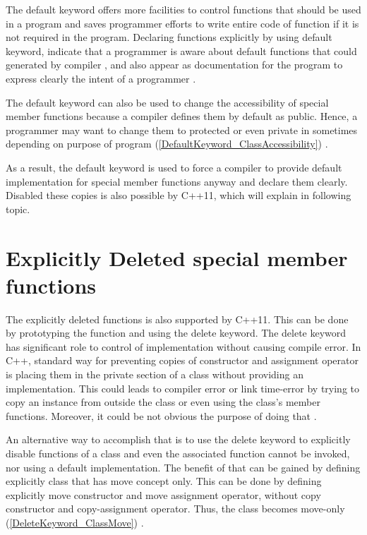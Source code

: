 \documentclass[11pt]{report}
\begin{document}
The default keyword offers more facilities to control functions that should be used in a program and saves programmer efforts to write entire code of function if it is not required in the program.  Declaring functions  explicitly by using default keyword, indicate  that  a programmer is  aware about  default functions that could generated by compiler , and also appear as documentation for the program to express clearly  the intent of a programmer \cite{Horstmann:2008:BC}.


The default keyword can also be used to change the accessibility of special member functions because a compiler defines them by default as public. Hence, a programmer may want to change them to protected or even private in sometimes depending on purpose of program (\ref{DefaultKeyword_ClassAccessibility}) \cite{Williams:2012:CCA}.


As a result, the default keyword is used to force a compiler to provide default implementation for special member functions anyway and declare them clearly. Disabled these copies is also possible by C++11, which will explain in following topic.


\section{Explicitly Deleted special member functions}
\label{section: Deleted special member functions}
The explicitly deleted functions is also supported by C++11. This can be done by prototyping the function and using the delete keyword. The delete keyword has significant role to control of implementation without causing compile error. In C++, standard way for preventing copies of constructor and assignment operator is placing them in the private section of a class without providing an implementation. This could leads to compiler error or link time-error by trying to copy an instance from outside the class or even using the class's member functions. Moreover, it could be not obvious the purpose of doing that \cite{Horstmann:2008:BC}.


An alternative way to accomplish that is to use the delete keyword to explicitly disable functions of a class and even the associated function cannot be invoked, nor using a default implementation. The benefit of that can be gained by defining explicitly class that has move concept only. This can be done by defining explicitly move constructor and move assignment operator, without copy constructor and copy-assignment operator. Thus, the class becomes move-only (\ref{DeleteKeyword_ClassMove}) \cite{Horstmann:2008:BC}.
\end{document}
